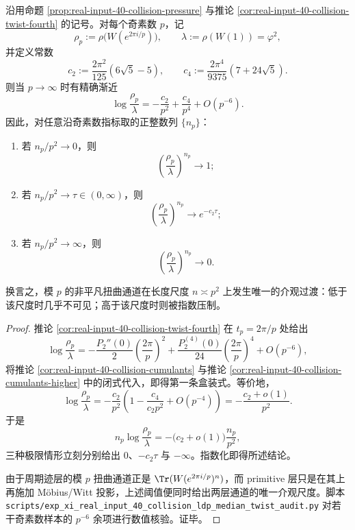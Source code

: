 \begin{theorem}\label{thm:xi-real-input-40-collision-prime-twist-p2-threshold}
沿用命题 \ref{prop:real-input-40-collision-pressure} 与推论 \ref{cor:real-input-40-collision-twist-fourth} 的记号。对每个奇素数 \(p\)，记
\[
\rho_p:=\rho\!\bigl(W(e^{2\pi i/p})\bigr),
\qquad
\lambda:=\rho(W(1))=\varphi^2,
\]
并定义常数
\[
c_2:=\frac{2\pi^2}{125}(6\sqrt5-5),
\qquad
c_4:=\frac{2\pi^4}{9375}(7+24\sqrt5).
\]
则当 \(p\to\infty\) 时有精确渐近
\[
\boxed{\;
\log\frac{\rho_p}{\lambda}
=
-\frac{c_2}{p^2}+\frac{c_4}{p^4}+O(p^{-6}).\;}
\]
因此，对任意沿奇素数指标取的正整数列 \(\{n_p\}\)：
\begin{enumerate}
  \item 若 \(n_p/p^2\to 0\)，则
  \[
  \left(\frac{\rho_p}{\lambda}\right)^{n_p}\to 1;
  \]
  \item 若 \(n_p/p^2\to \tau\in(0,\infty)\)，则
  \[
  \left(\frac{\rho_p}{\lambda}\right)^{n_p}\to e^{-c_2\tau};
  \]
  \item 若 \(n_p/p^2\to\infty\)，则
  \[
  \left(\frac{\rho_p}{\lambda}\right)^{n_p}\to 0.
  \]
\end{enumerate}
换言之，模 \(p\) 的非平凡扭曲通道在长度尺度 \(n\asymp p^2\) 上发生唯一的介观过渡：低于该尺度时几乎不可见；高于该尺度时则被指数压制。
\end{theorem}
\begin{proof}
推论 \ref{cor:real-input-40-collision-twist-fourth} 在 \(t_p=2\pi/p\) 处给出
\[
\log\frac{\rho_p}{\lambda}
=
-\frac{P_2''(0)}{2}\left(\frac{2\pi}{p}\right)^2
+\frac{P_2^{(4)}(0)}{24}\left(\frac{2\pi}{p}\right)^4
+O(p^{-6}),
\]
将推论 \ref{cor:real-input-40-collision-cumulants} 与推论 \ref{cor:real-input-40-collision-cumulants-higher} 中的闭式代入，即得第一条盒装式。等价地，
\[
\log\frac{\rho_p}{\lambda}
=
-\frac{c_2}{p^2}\left(1-\frac{c_4}{c_2p^2}+O(p^{-4})\right)
=
-\frac{c_2+o(1)}{p^2}.
\]
于是
\[
n_p\log\frac{\rho_p}{\lambda}
=
-\bigl(c_2+o(1)\bigr)\frac{n_p}{p^2},
\]
三种极限情形立刻分别给出 \(0\)、\(-c_2\tau\) 与 \(-\infty\)。指数化即得所述结论。
\par
由于周期迹层的模 \(p\) 扭曲通道正是 \(\Tr(W(e^{2\pi i/p})^n)\)，而 primitive 层只是在其上再施加 Möbius/Witt 投影，上述阈值便同时给出两层通道的唯一介观尺度。脚本 \texttt{scripts/exp\_xi\_real\_input\_40\_collision\_ldp\_median\_twist\_audit.py} 对若干奇素数样本的 \(p^{-6}\) 余项进行数值核验。证毕。
\end{proof}

